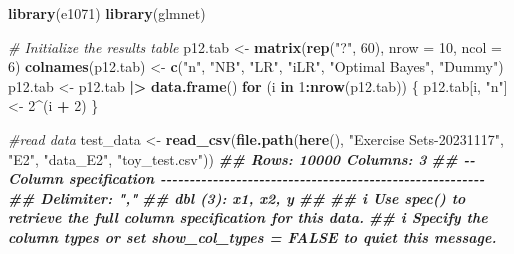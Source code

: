 \documentclass[
]{article}
\newenvironment{Shaded}{\begin{snugshade}}{\end{snugshade}}
\newcommand{\AttributeTok}[1]{\textcolor[rgb]{0.13,0.29,0.53}{#1}}
\newcommand{\CommentTok}[1]{\textcolor[rgb]{0.56,0.35,0.01}{\textit{#1}}}
\newcommand{\ControlFlowTok}[1]{\textcolor[rgb]{0.13,0.29,0.53}{\textbf{#1}}}
\newcommand{\DecValTok}[1]{\textcolor[rgb]{0.00,0.00,0.81}{#1}}
\newcommand{\DocumentationTok}[1]{\textcolor[rgb]{0.56,0.35,0.01}{\textbf{\textit{#1}}}}
\newcommand{\FunctionTok}[1]{\textcolor[rgb]{0.13,0.29,0.53}{\textbf{#1}}}
\newcommand{\NormalTok}[1]{#1}
\newcommand{\OtherTok}[1]{\textcolor[rgb]{0.56,0.35,0.01}{#1}}
\newcommand{\SpecialCharTok}[1]{\textcolor[rgb]{0.81,0.36,0.00}{\textbf{#1}}}
\newcommand{\StringTok}[1]{\textcolor[rgb]{0.31,0.60,0.02}{#1}}
\begin{document}
\begin{Shaded}
\begin{Highlighting}[]
\FunctionTok{library}\NormalTok{(e1071)}
\FunctionTok{library}\NormalTok{(glmnet)}

\CommentTok{\# Initialize the results table}
\NormalTok{p12.tab }\OtherTok{\textless{}{-}} \FunctionTok{matrix}\NormalTok{(}\FunctionTok{rep}\NormalTok{(}\StringTok{"?"}\NormalTok{, }\DecValTok{60}\NormalTok{), }\AttributeTok{nrow =} \DecValTok{10}\NormalTok{, }\AttributeTok{ncol =} \DecValTok{6}\NormalTok{)}
\FunctionTok{colnames}\NormalTok{(p12.tab) }\OtherTok{\textless{}{-}} \FunctionTok{c}\NormalTok{(}\StringTok{"n"}\NormalTok{, }\StringTok{"NB"}\NormalTok{, }\StringTok{"LR"}\NormalTok{, }\StringTok{"iLR"}\NormalTok{, }\StringTok{"Optimal Bayes"}\NormalTok{, }\StringTok{"Dummy"}\NormalTok{)}
\NormalTok{p12.tab }\OtherTok{\textless{}{-}}\NormalTok{ p12.tab }\SpecialCharTok{|\textgreater{}} \FunctionTok{data.frame}\NormalTok{()}
\ControlFlowTok{for}\NormalTok{ (i }\ControlFlowTok{in} \DecValTok{1}\SpecialCharTok{:}\FunctionTok{nrow}\NormalTok{(p12.tab)) \{}
\NormalTok{  p12.tab[i, }\StringTok{"n"}\NormalTok{] }\OtherTok{\textless{}{-}} \DecValTok{2}\SpecialCharTok{\^{}}\NormalTok{(i }\SpecialCharTok{+} \DecValTok{2}\NormalTok{)}
\NormalTok{\}}
\end{Highlighting}
\end{Shaded}

\begin{Shaded}
\begin{Highlighting}[]
\CommentTok{\#read data}
\NormalTok{test\_data }\OtherTok{\textless{}{-}} 
  \FunctionTok{read\_csv}\NormalTok{(}\FunctionTok{file.path}\NormalTok{(}\FunctionTok{here}\NormalTok{(), }\StringTok{"Exercise Sets{-}20231117"}\NormalTok{, }\StringTok{"E2"}\NormalTok{, }\StringTok{"data\_E2"}\NormalTok{, }\StringTok{"toy\_test.csv"}\NormalTok{))}
\DocumentationTok{\#\# Rows: 10000 Columns: 3}
\DocumentationTok{\#\# {-}{-} Column specification {-}{-}{-}{-}{-}{-}{-}{-}{-}{-}{-}{-}{-}{-}{-}{-}{-}{-}{-}{-}{-}{-}{-}{-}{-}{-}{-}{-}{-}{-}{-}{-}{-}{-}{-}{-}{-}{-}{-}{-}{-}{-}{-}{-}{-}{-}{-}{-}{-}{-}{-}{-}{-}{-}{-}{-}}
\DocumentationTok{\#\# Delimiter: ","}
\DocumentationTok{\#\# dbl (3): x1, x2, y}
\DocumentationTok{\#\# }
\DocumentationTok{\#\# i Use \textasciigrave{}spec()\textasciigrave{} to retrieve the full column specification for this data.}
\DocumentationTok{\#\# i Specify the column types or set \textasciigrave{}show\_col\_types = FALSE\textasciigrave{} to quiet this message.}
\end{Highlighting}
\end{Shaded}
\end{document}
